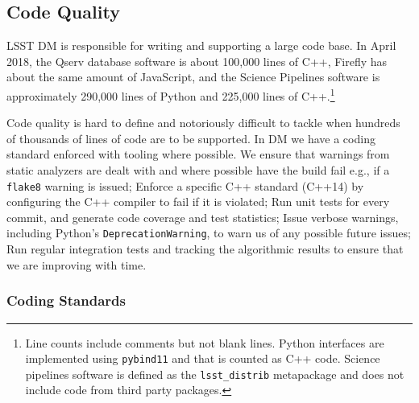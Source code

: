 \subsection{Code Quality}

LSST DM is responsible for writing and supporting a large code base.
In April 2018, the Qserv database software\cite{2011Wang:2011:QDS:2063348.2063364} is about 100,000 lines of C++, Firefly has about the same amount of JavaScript\cite{2016SPIE.9913E..0YR}, and the Science Pipelines software\cite{2018PASJ...70S...5B} is approximately 290,000 lines of Python and 225,000 lines of C++.\footnote{Line counts include comments but not blank lines. Python interfaces are implemented using \texttt{pybind11} and that is counted as C++ code. Science pipelines software is defined as the \texttt{lsst\_distrib} metapackage and does not include code from third party packages.}

%

\noindent Code quality is hard to define and notoriously difficult to tackle when hundreds of thousands of lines of code are to be supported.
In DM we have a
   coding standard\cite{devguide} enforced with tooling where possible. We ensure  that warnings from static analyzers are dealt with and where possible have the build fail e.g., if a \texttt{flake8} warning is issued;
Enforce a specific C++ standard (C++14) by configuring the C++ compiler to fail if it is violated;
Run unit tests for every commit, and generate code coverage and test statistics;
Issue verbose warnings, including Python's \texttt{DeprecationWarning}, to warn us of any possible future issues;
Run regular integration tests and tracking the algorithmic results to ensure that we are improving with time.

\subsubsection{Coding Standards}
\label{sec:coding-standards}

